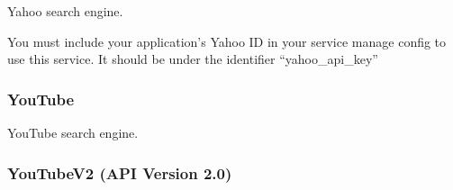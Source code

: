 \documentclass[letterpaper,10pt,english]{sphinxmanual}
\begin{document}
\begin{fulllineitems}
\label{api3.0:puppy.search.engine.Yahoo}
Yahoo search engine.

You must include your application's Yahoo ID in your service manage config to use this service. It should be under the identifier ``yahoo\_api\_key''

\end{fulllineitems}



\subsubsection{YouTube}
\label{api3.0:youtube}\label{api3.0:puppy-youtube}

\begin{fulllineitems}
\label{api3.0:puppy.search.engine.YouTube}
YouTube search engine.

\end{fulllineitems}



\subsubsection{YouTubeV2 (API Version 2.0)}
\label{api3.0:youtubev2-api-version-2-0}\label{api3.0:puppy-youtubev2}
\end{document}
